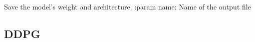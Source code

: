 \documentclass[letterpaper,10pt,english]{sphinxmanual}
\begin{document}
\begin{fulllineitems}
\begin{fulllineitems}
\end{fulllineitems}


\begin{fulllineitems}
\label{\detokenize{package2:dqn.DQNAgent.saveModel}}
Save the model's weight and architecture.
:param name: Name of the output file

\end{fulllineitems}


\end{fulllineitems}



\subsection{DDPG}
\label{\detokenize{package2:module-DDPG}}\label{\detokenize{package2:ddpg}}
\end{document}

